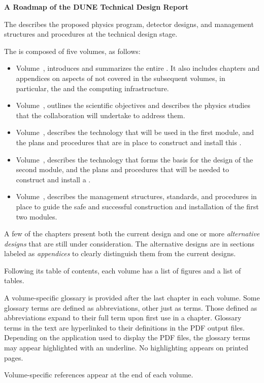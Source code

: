



{\LARGE
    \textbf{A Roadmap of the DUNE Technical Design Report}}

The   describes the proposed physics program,  
detector designs, and management structures and procedures at the technical design stage.  

The  is composed of five volumes, as follows:

\begin{itemize}
\item Volume~\volnumberexec{}, \voltitleexec{} introduces and summarizes the entire . It also includes chapters and appendices on aspects of  not covered in the subsequent volumes, in particular, the  and the computing infrastructure.

\item Volume~\volnumberphysics{}, \voltitlephysics{} outlines the scientific objectives and describes the physics studies that  the  collaboration will undertake to address them.

\item Volume~\volnumbersp{}, \voltitlesp{} describes the  technology that will be used in the first  module, and the plans and procedures that are in place to construct and install  this .

\item Volume~\volnumberdp{}, \voltitledp{} describes the  technology that forms the basis for the design of the second  module, and the plans and procedures that will be needed to construct and install a . 

\item Volume~\volnumbertc{}, \voltitletc{} describes the management structures, standards, and procedures in place to guide the safe and successful construction and installation of the first two  modules.
\end{itemize}

A few of the chapters present both the current design and one or more \textit{alternative designs} that are still under consideration. The alternative designs are in sections labeled as \textit{appendices} to clearly distinguish them from the current designs. 

Following its table of contents, each volume has a list of figures and a list of tables.

A volume-specific glossary is provided after the last chapter in each volume.  Some glossary terms are defined as abbreviations, other just as terms. Those defined as abbreviations expand to their full term upon first use in a chapter. Glossary terms in the text are hyperlinked  to their definitions in the PDF output files. 
Depending on the application used to display the PDF files, the glossary terms may appear highlighted with an underline.  No highlighting appears on printed pages.

Volume-specific references appear at the end of each volume. 


